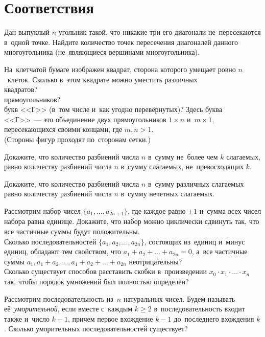 
\section*{Соответствия}


\begin{problems}

\item
Дан выпуклый $n$-угольник такой, что никакие три его диагонали не~пересекаются
в~одной точке.
Найдите количество точек пересечения диагоналей данного многоугольника
(не~являющиеся вершинами многоугольника).

\item
На~клетчатой бумаге изображен квадрат, сторона которого умещает ровно
$n$~клеток.
Сколько в~этом квадрате можно уместить различных
\\
\sp квадратов?
\\
\sp прямоугольников?
\\
\sp
букв <<Г>> (в~том числе и~как угодно перевёрнутых)?
Здесь буква <<Г>>~--- это объединение двух прямоугольников
$1 \times n$ и~$m \times 1$, пересекающихся своими концами, где $m, n > 1$.
\\
(Стороны фигур проходят по~сторонам сетки.)

\item
Докажите, что количество разбиений числа $n$ в~сумму не~более чем
$k$ слагаемых, равно количеству разбиений числа $n$ в~сумму слагаемых,
не~превосходящих $k$.

\item
Докажите, что количество разбиений числа $n$ в~сумму различных слагаемых равно
количеству разбиений числа $n$ в~сумму нечетных слагаемых.

\item
\sp
Рассмотрим набор чисел $\{a_1, \ldots, a_{2n + 1}\}$, где каждое равно
$\pm 1$ и~сумма всех чисел набора равна единице.
Докажите, что набор можно циклически сдвинуть так, что все частичные суммы
будут положительны.
\\
\sp
Сколько последовательностей  $\{a_1, a_2, \ldots , a_{2n}\}$, состоящих
из~единиц и~минус единиц, обладают тем свойством, что 
$a_1 + a_2 + \ldots + a_{2n} = 0$,  а~все частичные суммы
$a_1,  a_1 + a_2, \ldots,  a_1 + a_2 + \ldots + a_{2n}$ неотрицательны?
\\
\sp
Сколько существует способов расставить скобки в~произведении
$x_0 \cdot x_1 \cdot \ldots \cdot x_n$ так, чтобы порядок умножений был
полностью определен?

\item
Рассмотрим последовательность из~$n$ натуральных чисел.
Будем называть её~\emph{уморительной}, если вместе с~каждым $k \geqslant 2$
в~последовательность входит также и~число $k - 1$, причем первое вхождение
$k - 1$ до~последнего вхождения $k$.
Сколько уморительных последовательностей существует?

\end{problems}

